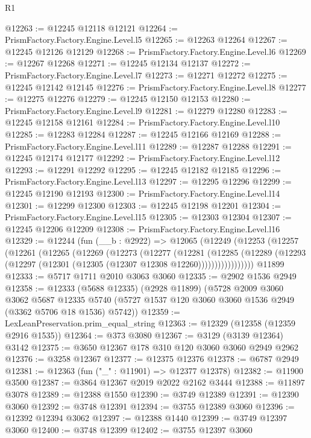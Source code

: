 \begin{lexlean}{R1}
\begin{coremodule}
@12263 := @12245 @12118 @12121
@12264 := PrismFactory.Factory.Engine.Level.l5
@12265 := @12263 @12264
@12267 := @12245 @12126 @12129
@12268 := PrismFactory.Factory.Engine.Level.l6
@12269 := @12267 @12268
@12271 := @12245 @12134 @12137
@12272 := PrismFactory.Factory.Engine.Level.l7
@12273 := @12271 @12272
@12275 := @12245 @12142 @12145
@12276 := PrismFactory.Factory.Engine.Level.l8
@12277 := @12275 @12276
@12279 := @12245 @12150 @12153
@12280 := PrismFactory.Factory.Engine.Level.l9
@12281 := @12279 @12280
@12283 := @12245 @12158 @12161
@12284 := PrismFactory.Factory.Engine.Level.l10
@12285 := @12283 @12284
@12287 := @12245 @12166 @12169
@12288 := PrismFactory.Factory.Engine.Level.l11
@12289 := @12287 @12288
@12291 := @12245 @12174 @12177
@12292 := PrismFactory.Factory.Engine.Level.l12
@12293 := @12291 @12292
@12295 := @12245 @12182 @12185
@12296 := PrismFactory.Factory.Engine.Level.l13
@12297 := @12295 @12296
@12299 := @12245 @12190 @12193
@12300 := PrismFactory.Factory.Engine.Level.l14
@12301 := @12299 @12300
@12303 := @12245 @12198 @12201
@12304 := PrismFactory.Factory.Engine.Level.l15
@12305 := @12303 @12304
@12307 := @12245 @12206 @12209
@12308 := PrismFactory.Factory.Engine.Level.l16
@12329 := @12244
    (fun (__b : @2922) =>
    @12065
      (@12249
        (@12253
          (@12257
            (@12261
              (@12265
                (@12269
                  (@12273
                    (@12277
                      (@12281
                        (@12285
                          (@12289
                            (@12293 (@12297 (@12301 (@12305 (@12307 @12308 @12260)))))))))))))))))
    @11899
@12333 := @5717 @1711 @2010 @3063 @3060
@12335 := @2902 @1536 @2949
@12358 := @12333
    (@5688 @12335)
    (@2928 @11899)
    (@5728
      @2009
      @3060
      @3062
      @5687
      @12335
      @5740
      (@5727 @1537 @120 @3060 @3060 @1536 @2949 (@3362 @5706 @18 @1536) @5742))
@12359 := LexLeanPreservation.prim_equal_string
@12363 := @12329 (@12358 (@12359 @2916 @1535))
@12364 := @373 @3080
@12367 := @3129 (@3139 @12364) @3142
@12375 := @3650 @12367 @178 @310 @120 @3060 @3060 @2949 @2962
@12376 := @3258 @12367
@12377 := @12375 @12376
@12378 := @6787 @2949
@12381 := @12363 (fun ("_" : @11901) => @12377 @12378)
@12382 := @11900 @3500
@12387 := @3864 @12367 @2019 @2022 @2162 @3444
@12388 := @11897 @3078
@12389 := @12388 @1550
@12390 := @3749 @12389
@12391 := @12390 @3060
@12392 := @3748 @12391
@12394 := @3755 @12389 @3060
@12396 := @12392 @12394 @3062
@12397 := @12388 @1440
@12399 := @3749 @12397 @3060
@12400 := @3748 @12399
@12402 := @3755 @12397 @3060

\end{coremodule}
\end{lexlean}
